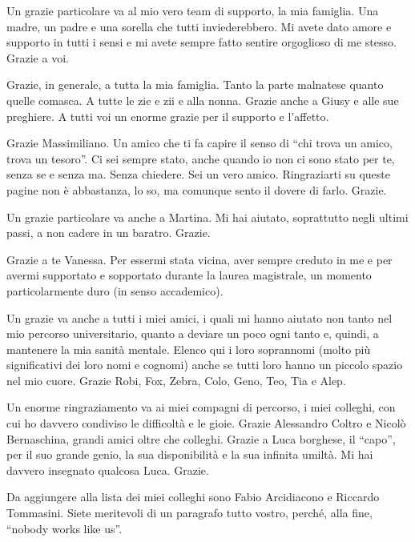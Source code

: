 Un grazie particolare va al mio vero team di supporto, la mia famiglia. Una madre, un padre e una sorella che tutti inviederebbero. Mi avete dato amore e supporto in tutti i sensi e mi avete sempre fatto sentire orgoglioso di me stesso. Grazie a voi.

Grazie, in generale, a tutta la mia famiglia. Tanto la parte malnatese quanto quelle comasca. A tutte le zie e zii e alla nonna. Grazie anche a Giusy e alle sue preghiere. A tutti voi un enorme grazie per il supporto e l'affetto.

Grazie Massimiliano. Un amico che ti fa capire il senso di ``chi trova un amico, trova un tesoro''. Ci sei sempre stato, anche quando io non ci sono stato per te, senza se e senza ma. Senza chiedere. Sei un vero amico. Ringraziarti su queste pagine non è abbastanza, lo so, ma comunque sento il dovere di farlo. Grazie.

Un grazie particolare va anche a Martina. Mi hai aiutato, soprattutto negli ultimi passi, a non cadere in un baratro. Grazie.

Grazie a te Vanessa. Per essermi stata vicina, aver sempre creduto in me e per avermi supportato e sopportato durante la laurea magistrale, un momento particolarmente duro (in senso accademico).

Un grazie va anche a tutti i miei amici, i quali mi hanno aiutato non tanto nel mio percorso universitario, quanto a deviare un poco ogni tanto e, quindi, a mantenere la mia sanità mentale. Elenco qui i loro soprannomi (molto più significativi dei loro nomi e cognomi) anche se tutti loro hanno un piccolo spazio nel mio cuore. Grazie Robi, Fox, Zebra, Colo, Geno, Teo, Tia e Alep.

Un enorme ringraziamento va ai miei compagni di percorso, i miei colleghi, con cui ho davvero condiviso le difficoltà e le gioie. Grazie Alessandro Coltro e Nicolò Bernaschina, grandi amici oltre che colleghi. Grazie a Luca borghese, il ``capo'', per il suo grande genio, la sua disponibilità e la sua infinita umiltà. Mi hai davvero insegnato qualcosa Luca. Grazie.

Da aggiungere alla lista dei miei colleghi sono Fabio Arcidiacono e Riccardo Tommasini. Siete meritevoli di un paragrafo tutto vostro, perché, alla fine, ``nobody works like us''.